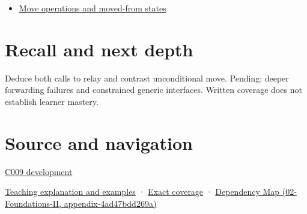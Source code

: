 \begin{itemize}
\tightlist
\item
  \hyperref[appendix-5636651017c2]{Move operations and moved-from states}
\end{itemize}

\section{Recall and next depth}\label{appendix-0104b704fb11-recall-and-next-depth}

Deduce both calls to relay and contrast unconditional move. Pending: deeper forwarding failures and constrained generic interfaces. Written coverage does not establish learner mastery.

\section{Source and navigation}\label{appendix-0104b704fb11-source-and-navigation}

\hyperref[appendix-fd090d982a15-m009---parts-127-147]{C009 development}

\href{Continuous\%20Notes/Computing\%20Foundations\%20-\%20From\%20Bits\%20to\%20C++\%20and\%20Systems\%20APIs\#Move\%20permission\%20is\%20not\%20resource\%20transfer}{Teaching explanation and examples} · \hyperref[appendix-fd090d982a15-m008---parts-113-126]{Exact coverage} · \href{../02-Foundations-II/main.pdf\#nameddest=appendix-4ad47bdd269a}{Dependency Map (02-Foundations-II, appendix-4ad47bdd269a)}
